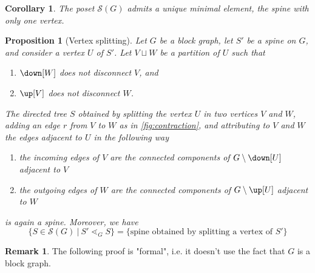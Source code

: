\documentclass{amsart}
\newtheorem{corollary}[theorem]{Corollary}
\newtheorem{proposition}[theorem]{Proposition}
\theoremstyle{definition}
\newtheorem{remark}[theorem]{Remark}
\begin{document}
\begin{corollary} 
  The poset $\mathcal{S}(G)$ admits a unique minimal element, the spine with only one vertex. 
\end{corollary}

\begin{proposition}[Vertex splitting] 
  \label{prop:vertexsplitting} 
  Let $G$ be a block graph, let $S'$ be a spine on $G$, and consider a vertex $U$ of $S'$. Let $V \sqcup W$ be a partition of $U$ such that
  \begin{enumerate}
    \item $\down[W]$ does not disconnect $V$, and
    \item $\up[V]$ does not disconnect $W$.
  \end{enumerate}
The directed tree $S$ obtained by splitting the vertex $U$ in two vertices $V$ and $W$, adding an edge $r$ from $V$ to $W$ as in \cref{fig:contraction}, and attributing to $V$ and $W$ the edges adjacent to $U$ in the following way
  \begin{enumerate}
    \item[(i)] the incoming edges of $V$ are the connected components of $G\setminus\down[U]$ adjacent to $V$
    \item[(ii)] the outgoing edges of $W$ are the connected components of $G\setminus\up[U]$ adjacent to $W$
  \end{enumerate}
is again a spine. Moreover, we have
  \[\{ S\in\mathcal{S}(G) \ | \ S'\lessdot_G S \}=\{\text{spine obtained by splitting a vertex of } S'\}\]
\end{proposition}

\begin{remark}
  The following proof is "formal", i.e. it doesn't use the fact that $G$ is a block graph. 
\end{remark}
\end{document}
